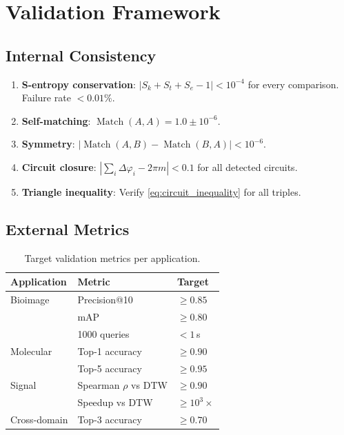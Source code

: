 \documentclass[11pt,twocolumn,a4paper]{article}
\newcommand{\Sk}{S_k}
\newcommand{\St}{S_t}
\newcommand{\Se}{S_e}
\DeclareMathOperator{\Match}{Match}
\begin{document}
\section{Validation Framework}
\label{sec:validation}

\subsection{Internal Consistency}

\begin{enumerate}[nosep]
  \item \textbf{S-entropy conservation}: $|\Sk + \St + \Se - 1| < 10^{-4}$
    for every comparison. Failure rate $< 0.01\%$.
  \item \textbf{Self-matching}: $\Match(A, A) = 1.0 \pm 10^{-6}$.
  \item \textbf{Symmetry}: $|\Match(A,B) - \Match(B,A)| < 10^{-6}$.
  \item \textbf{Circuit closure}: $|\sum_i \Delta\varphi_i - 2\pi m|
    < 0.1$ for all detected circuits.
  \item \textbf{Triangle inequality}: Verify
    \eqref{eq:circuit_inequality} for all triples.
\end{enumerate}

\subsection{External Metrics}

\begin{table}[t]
\centering
\caption{Target validation metrics per application.}
\label{tab:validation}
\begin{tabular}{lll}
\toprule
\textbf{Application} & \textbf{Metric} & \textbf{Target} \\
\midrule
Bioimage & Precision@10 & $\geq 0.85$ \\
         & mAP & $\geq 0.80$ \\
         & 1000 queries & $< 1$\,s \\
\midrule
Molecular & Top-1 accuracy & $\geq 0.90$ \\
          & Top-5 accuracy & $\geq 0.95$ \\
\midrule
Signal & Spearman $\rho$ vs DTW & $\geq 0.90$ \\
       & Speedup vs DTW & $\geq 10^3\times$ \\
\midrule
Cross-domain & Top-3 accuracy & $\geq 0.70$ \\
\bottomrule
\end{tabular}
\end{table}
\end{document}

